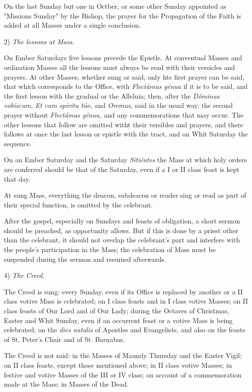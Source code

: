 On the last Sunday but one in Octber, or some other Sunday appointed as "Missions Sunday" by the Bishop, the prayer for the Propagation of the Faith is added at all Masses under a single conclusion.

2) {\it The lessons at Mass.}

On Ember Saturdays five lessons precede the Epistle. At conventual Masses and ordination Masses all the lessons must always be read with their versicles and prayers. At other Masses, whether sung or said, only hte first prayer can be said, that which corresponds to the Office, with {\it Flectámus génua} if it is to be said, and the first lesson with the gradual or the Alleluia; then, after the {\it Dóminus vobíscum, Et cum spíritu túo,} and {\it Oremus,} said in the usual way, the second prayer without {\it Flectámus génua,} and any commemorations that may occur. The other lessons that follow are omitted witht their versibles and prayers, and there follows at once the last lesson or epistle with the tract, and on Whit Saturday the sequence.

On an Ember Saturday and the Saturday {\it Sitiéntes} the Mass at which holy orders are conferred should be that of the Saturday, even if a I or II class feast is kept that day.

At sung Mass, everything the deacon, subdeacon or reader sing or read as part of their special function, is omitted by the celebrant.

After the gospel, especially on Sundays and feasts of obligation, a short sermon should be preached, as opportunity allows. But if this is done by a priest other than the celebrant, it should not overlap the celebrant's part and interfere with the people's participation in the Mass; the celebration of Mass must be suspended during the sermon and resumed afterwards.

4) {\it The Creed.}

The Creed is sung:
every Sunday, even if its Office is replaced by another or a II class votive Mass is celebrated;
on I class feasts and in I class votive Masses;
on II class feasts of Our Lord and of Our Lady;
during the Octaves of Christmas, Easter and Whit Sunday, even if an occurrent feast or a votive Mass is being celebrated;
on the {\it dies natalis} of Apostles and Evangelists, and also on the feasts of St. Peter's Chair and of St. Barnabas.

The Creed is not said:
in the Masses of Maundy Thursday and the Easter Vigil;
on II class feasts, except those mentioned above;
in II class votive Masses;
in festive and votive Masses of the III or IV class;
on account of a commemoration made at the Mass;
in Masses of the Dead.

